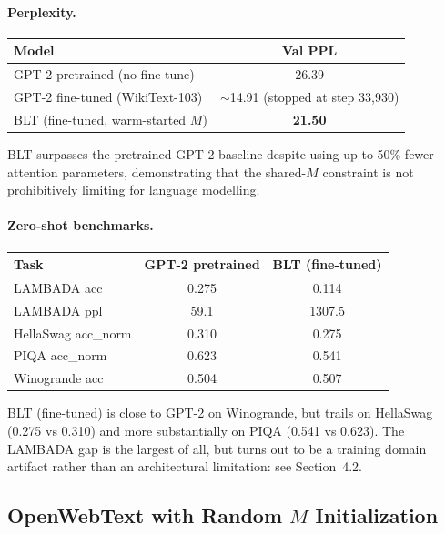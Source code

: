 \documentclass[11pt]{article}
\begin{document}
\paragraph{Perplexity.}

\begin{center}
\begin{tabular}{lc}
\toprule
Model & Val PPL \\
\midrule
GPT-2 pretrained (no fine-tune) & 26.39 \\
GPT-2 fine-tuned (WikiText-103) & $\sim$14.91 (stopped at step 33{,}930) \\
BLT (fine-tuned, warm-started $M$) & \textbf{21.50} \\
\bottomrule
\end{tabular}
\end{center}

BLT surpasses the pretrained GPT-2 baseline despite using up to 50\% fewer attention parameters, demonstrating that the shared-$M$ constraint is not prohibitively limiting for language modelling.

\paragraph{Zero-shot benchmarks.}

\begin{center}
\begin{tabular}{lcc}
\toprule
Task & GPT-2 pretrained & BLT (fine-tuned) \\
\midrule
LAMBADA acc & 0.275 & 0.114 \\
LAMBADA ppl & 59.1 & 1307.5 \\
HellaSwag acc\_norm & 0.310 & 0.275 \\
PIQA acc\_norm & 0.623 & 0.541 \\
Winogrande acc & 0.504 & 0.507 \\
\bottomrule
\end{tabular}
\end{center}

BLT (fine-tuned) is close to GPT-2 on Winogrande, but trails on HellaSwag (0.275 vs 0.310) and more substantially on PIQA (0.541 vs 0.623). The LAMBADA gap is the largest of all, but turns out to be a training domain artifact rather than an architectural limitation: see Section~4.2.

\subsection{OpenWebText with Random $M$ Initialization}
\end{document}
